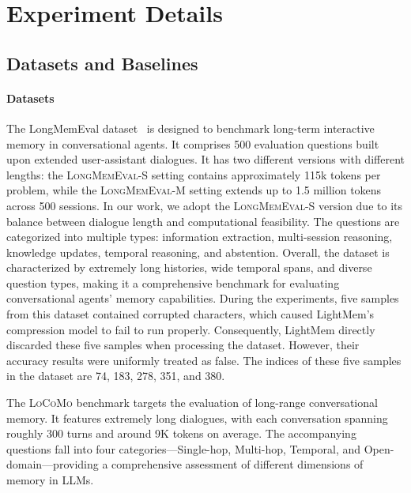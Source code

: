\section{Experiment Details}
\label{experiment_detail}

\subsection{Datasets and Baselines}
\paragraph{Datasets} 
The LongMemEval dataset~\citep{DBLP:conf/iclr/WuWYZCY25} is designed to benchmark long-term interactive memory in conversational agents. 
It comprises 500 evaluation questions built upon extended user-assistant dialogues. 
It has two different versions with different lengths: the \textsc{LongMemEval-S} setting contains approximately 115k tokens per problem, while the \textsc{LongMemEval-M} setting extends up to 1.5 million tokens across 500 sessions. 
In our work, we adopt the \textsc{LongMemEval-S} version due to its balance between dialogue length and computational feasibility.
The questions are categorized into multiple types: 
information extraction, multi-session reasoning, knowledge updates, temporal reasoning, and abstention. 
Overall, the dataset is characterized by extremely long histories, wide temporal spans, and diverse question types, making it a comprehensive benchmark for evaluating conversational agents' memory capabilities. 
During the experiments, five samples from this dataset contained corrupted characters, which caused LightMem’s compression model to fail to run properly. Consequently, LightMem directly discarded these five samples when processing the dataset. 
However, their accuracy results were uniformly treated as false. The indices of these five samples in the dataset are 74, 183, 278, 351, and 380. 

The \textsc{LoCoMo} benchmark targets the evaluation of long-range conversational memory. It features extremely long dialogues, with each conversation spanning roughly 300 turns and around 9K tokens on average. The accompanying questions fall into four categories—Single-hop, Multi-hop, Temporal, and Open-domain—providing a comprehensive assessment of different dimensions of memory in LLMs.


